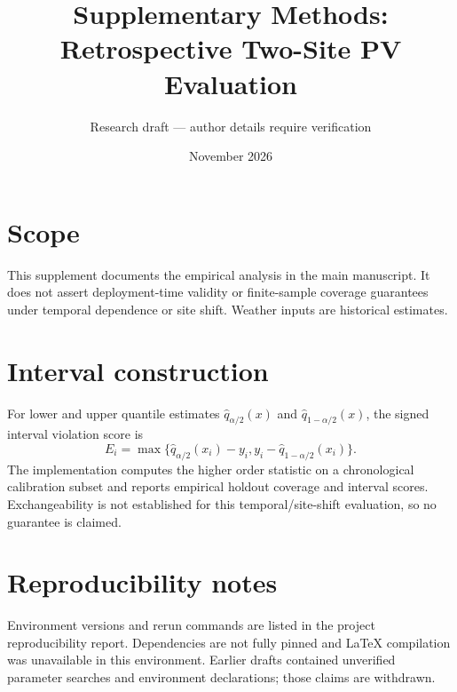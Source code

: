 \documentclass[11pt]{article}
\title{Supplementary Methods: Retrospective Two-Site PV Evaluation}
\author{Research draft — author details require verification}
\date{November 2026}
\begin{document}
\maketitle
\section{Scope}
This supplement documents the empirical analysis in the main manuscript. It does not assert deployment-time validity or finite-sample coverage guarantees under temporal dependence or site shift. Weather inputs are historical estimates.
\section{Interval construction}
For lower and upper quantile estimates $\hat q_{\alpha/2}(x)$ and $\hat q_{1-\alpha/2}(x)$, the signed interval violation score is
\begin{equation}
E_i=\max\{\hat q_{\alpha/2}(x_i)-y_i, y_i-\hat q_{1-\alpha/2}(x_i)\}.
\end{equation}
The implementation computes the higher order statistic on a chronological calibration subset and reports empirical holdout coverage and interval scores. Exchangeability is not established for this temporal/site-shift evaluation, so no guarantee is claimed.
\section{Reproducibility notes}
Environment versions and rerun commands are listed in the project reproducibility report. Dependencies are not fully pinned and LaTeX compilation was unavailable in this environment. Earlier drafts contained unverified parameter searches and environment declarations; those claims are withdrawn.
\end{document}
